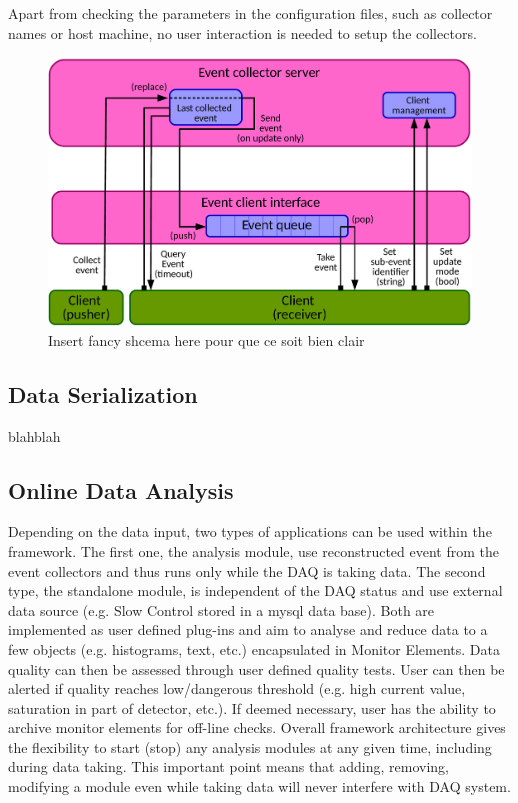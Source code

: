 \documentclass[conference]{IEEEtran}
\begin{document}
Apart from checking the parameters in the configuration files, such as collector names or host machine, no user interaction is needed to setup the collectors.

\begin{figure}[htbp]
  \begin{center}
    \includegraphics[width=0.95\linewidth]{figs/EventCollectorDiagram.pdf}
    \caption{\label{fig:DQMDataAccess} \color{red}Insert fancy shcema here pour que ce soit bien clair}
  \end{center}
\end{figure}

\subsection{Data Serialization}

blahblah


\subsection{Online Data Analysis}
Depending on the data input, two types of applications can be used within the framework. The first one, the analysis module, use reconstructed event from the event collectors and thus runs only while the DAQ is taking data. The second type, the standalone module, is independent of the DAQ status and use external data source (e.g. Slow Control stored in a mysql data base).
Both are implemented as user defined plug-ins and aim to analyse and reduce data to a few objects (e.g. histograms, text, etc.) encapsulated in Monitor Elements. Data quality can then be assessed through user defined quality tests. User can then be alerted if quality reaches low/dangerous threshold (e.g. high current value, saturation in part of detector, etc.). If deemed necessary, user has the ability to archive monitor elements for off-line checks.
Overall framework architecture gives the flexibility to start (stop) any analysis modules at any given time, including during data taking. This important point means that adding, removing, modifying a module even while taking data will never interfere with DAQ system.
\end{document}

